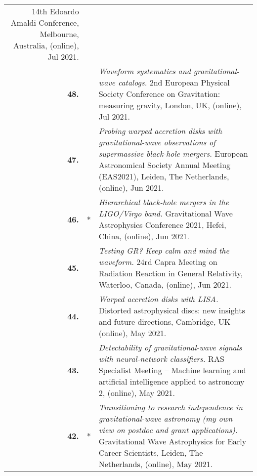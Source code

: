 {\begin{longtable}{rp{0.3cm}p{15.8cm}}
14th Edoardo Amaldi Conference, Melbourne, Australia, (online), Jul 2021.
\vspace{0.05cm}\\
%
\textbf{48.} &  & \textit{Waveform systematics and gravitational-wave catalogs.}
\newline{}
2nd European Physical Society Conference on Gravitation: measuring gravity, London, UK, (online), Jul 2021.
\vspace{0.05cm}\\
%
\textbf{47.} &  & \textit{Probing warped accretion disks with gravitational-wave observations of supermassive black-hole mergers.}
\newline{}
European Astronomical Society Annual Meeting (EAS2021), Leiden, The Netherlands, (online), Jun 2021.
\vspace{0.05cm}\\
%
\textbf{46.} & * & \textit{Hierarchical black-hole mergers in the LIGO/Virgo band.}
\newline{}
Gravitational Wave Astrophysics Conference 2021, Hefei, China, (online), Jun 2021.
\vspace{0.05cm}\\
%
\textbf{45.} &  & \textit{Testing GR? Keep calm and mind the waveform.}
\newline{}
24rd Capra Meeting on Radiation Reaction in General Relativity, Waterloo, Canada, (online), Jun 2021.
\vspace{0.05cm}\\
%
\textbf{44.} &  & \textit{Warped accretion disks with LISA.}
\newline{}
Distorted astrophysical discs: new insights and future directions, Cambridge, UK (online), May 2021.
\vspace{0.05cm}\\
%
\textbf{43.} &  & \textit{Detectability of gravitational-wave signals with neural-network classifiers.}
\newline{}
RAS Specialist Meeting -- Machine learning and artificial intelligence applied to astronomy 2, (online), May 2021.
\vspace{0.05cm}\\
%
\textbf{42.} & * & \textit{Transitioning to research independence in gravitational-wave astronomy (my own view on postdoc and grant applications).}
\newline{}
Gravitational Wave Astrophysics for Early Career Scientists, Leiden, The Netherlands, (online), May 2021.
\vspace{0.05cm}\\

\end{longtable}}
